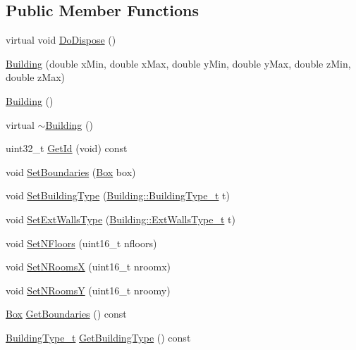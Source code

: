 \subsection*{Public Member Functions}
\begin{DoxyCompactItemize}
\item 
virtual void \hyperlink{classns3_1_1Building_ae9cd51ef5b6abbf9c489dc72c335cd86}{Do\+Dispose} ()
\item 
\hyperlink{classns3_1_1Building_a17f04a22f2c7eccbd08493c95e464b37}{Building} (double x\+Min, double x\+Max, double y\+Min, double y\+Max, double z\+Min, double z\+Max)
\item 
\hyperlink{classns3_1_1Building_a084396234ba491e17b34896481101cd9}{Building} ()
\item 
virtual \hyperlink{classns3_1_1Building_a6965d43bf515274dfb93e970a5c8c84f}{$\sim$\+Building} ()
\item 
uint32\+\_\+t \hyperlink{classns3_1_1Building_a69aa3b91a01813b264d2feb405f541da}{Get\+Id} (void) const 
\item 
void \hyperlink{classns3_1_1Building_a4b69659f05a983f06e33e7db62415915}{Set\+Boundaries} (\hyperlink{classns3_1_1Box}{Box} box)
\item 
void \hyperlink{classns3_1_1Building_a2f193ed27d25ed8bf29962d3c7d77204}{Set\+Building\+Type} (\hyperlink{classns3_1_1Building_af7f3940d00690b70af02310575d94ef3}{Building\+::\+Building\+Type\+\_\+t} t)
\item 
void \hyperlink{classns3_1_1Building_a8084b2aafb9ca8bcb775fad0319d42e8}{Set\+Ext\+Walls\+Type} (\hyperlink{classns3_1_1Building_a298adc08038580830c70d4cac8fcfefe}{Building\+::\+Ext\+Walls\+Type\+\_\+t} t)
\item 
void \hyperlink{classns3_1_1Building_ae9f97075b5c8bf4685703e30ed049791}{Set\+N\+Floors} (uint16\+\_\+t nfloors)
\item 
void \hyperlink{classns3_1_1Building_a60eac680f1059fb9d883a659607e2fae}{Set\+N\+RoomsX} (uint16\+\_\+t nroomx)
\item 
void \hyperlink{classns3_1_1Building_a9103ee5b5edf013624d7e18422c4ba06}{Set\+N\+RoomsY} (uint16\+\_\+t nroomy)
\item 
\hyperlink{classns3_1_1Box}{Box} \hyperlink{classns3_1_1Building_ace7276537dcf00cf61c4925e878c3c44}{Get\+Boundaries} () const 
\item 
\hyperlink{classns3_1_1Building_af7f3940d00690b70af02310575d94ef3}{Building\+Type\+\_\+t} \hyperlink{classns3_1_1Building_a366fba7f63f74854a9e56abf62736f4b}{Get\+Building\+Type} () const 

\end{DoxyCompactItemize}
